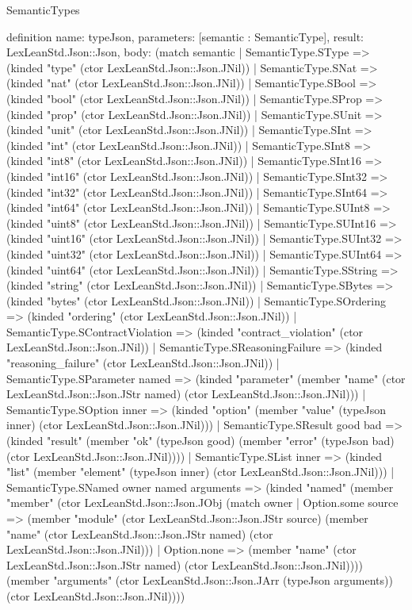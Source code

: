 \begin{lexlean}{SemanticTypes}
\begin{semanticmodule}
definition{
  name: typeJson,
  parameters: [semantic : SemanticType],
  result: LexLeanStd.Json::Json,
  body: (match semantic
    | SemanticType.SType => (kinded "type" (ctor LexLeanStd.Json::Json.JNil))
    | SemanticType.SNat => (kinded "nat" (ctor LexLeanStd.Json::Json.JNil))
    | SemanticType.SBool => (kinded "bool" (ctor LexLeanStd.Json::Json.JNil))
    | SemanticType.SProp => (kinded "prop" (ctor LexLeanStd.Json::Json.JNil))
    | SemanticType.SUnit => (kinded "unit" (ctor LexLeanStd.Json::Json.JNil))
    | SemanticType.SInt => (kinded "int" (ctor LexLeanStd.Json::Json.JNil))
    | SemanticType.SInt8 => (kinded "int8" (ctor LexLeanStd.Json::Json.JNil))
    | SemanticType.SInt16 => (kinded "int16" (ctor LexLeanStd.Json::Json.JNil))
    | SemanticType.SInt32 => (kinded "int32" (ctor LexLeanStd.Json::Json.JNil))
    | SemanticType.SInt64 => (kinded "int64" (ctor LexLeanStd.Json::Json.JNil))
    | SemanticType.SUInt8 => (kinded "uint8" (ctor LexLeanStd.Json::Json.JNil))
    | SemanticType.SUInt16 => (kinded "uint16" (ctor LexLeanStd.Json::Json.JNil))
    | SemanticType.SUInt32 => (kinded "uint32" (ctor LexLeanStd.Json::Json.JNil))
    | SemanticType.SUInt64 => (kinded "uint64" (ctor LexLeanStd.Json::Json.JNil))
    | SemanticType.SString => (kinded "string" (ctor LexLeanStd.Json::Json.JNil))
    | SemanticType.SBytes => (kinded "bytes" (ctor LexLeanStd.Json::Json.JNil))
    | SemanticType.SOrdering => (kinded "ordering" (ctor LexLeanStd.Json::Json.JNil))
    | SemanticType.SContractViolation => (kinded "contract_violation" (ctor LexLeanStd.Json::Json.JNil))
    | SemanticType.SReasoningFailure => (kinded "reasoning_failure" (ctor LexLeanStd.Json::Json.JNil))
    | SemanticType.SParameter named => (kinded "parameter" (member "name" (ctor LexLeanStd.Json::Json.JStr named) (ctor LexLeanStd.Json::Json.JNil)))
    | SemanticType.SOption inner => (kinded "option" (member "value" (typeJson inner) (ctor LexLeanStd.Json::Json.JNil)))
    | SemanticType.SResult good bad => (kinded "result" (member "ok" (typeJson good) (member "error" (typeJson bad) (ctor LexLeanStd.Json::Json.JNil))))
    | SemanticType.SList inner => (kinded "list" (member "element" (typeJson inner) (ctor LexLeanStd.Json::Json.JNil)))
    | SemanticType.SNamed owner named arguments => (kinded "named" (member "member" (ctor LexLeanStd.Json::Json.JObj (match owner
      | Option.some source => (member "module" (ctor LexLeanStd.Json::Json.JStr source) (member "name" (ctor LexLeanStd.Json::Json.JStr named) (ctor LexLeanStd.Json::Json.JNil)))
      | Option.none => (member "name" (ctor LexLeanStd.Json::Json.JStr named) (ctor LexLeanStd.Json::Json.JNil)))) (member "arguments" (ctor LexLeanStd.Json::Json.JArr (typeJson arguments)) (ctor LexLeanStd.Json::Json.JNil))))
}
\end{semanticmodule}
\end{lexlean}
